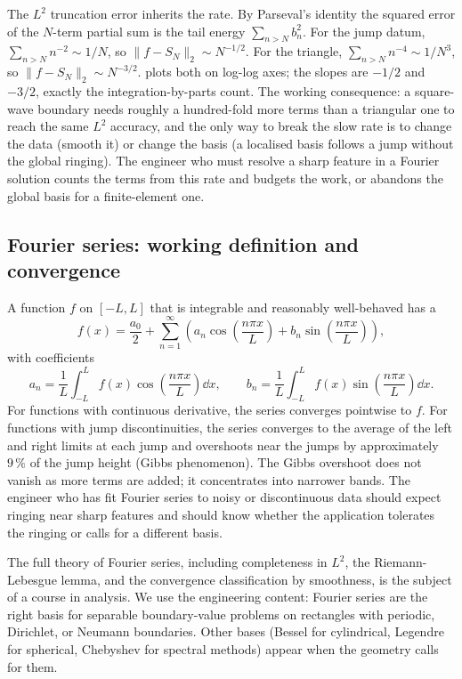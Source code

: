The $L^{2}$ truncation error inherits the rate. By Parseval's
identity the squared error of the $N$-term partial sum is the tail
energy $\sum_{n > N} b_{n}^{2}$. For the jump datum, $\sum_{n > N}
n^{-2} \sim 1/N$, so $\|f - S_{N}\|_{2} \sim N^{-1/2}$. For the
triangle, $\sum_{n > N} n^{-4} \sim 1/N^{3}$, so $\|f - S_{N}\|_{2}
\sim N^{-3/2}$.  plots both
on log-log axes; the slopes are $-1/2$ and $-3/2$, exactly the
integration-by-parts count. The working consequence: a square-wave
boundary needs roughly a hundred-fold more terms than a triangular
one to reach the same $L^{2}$ accuracy, and the only way to break
the slow rate is to change the data (smooth it) or change the basis
(a localised basis follows a jump without the global ringing). The
engineer who must resolve a sharp feature in a Fourier solution
counts the terms from this rate and budgets the work, or abandons
the global basis for a finite-element one.



\subsection{Fourier series: working definition and convergence}

A function $f$ on $[-L, L]$ that is integrable and reasonably
well-behaved has a 
\[
f(x) = \frac{a_{0}}{2} + \sum_{n = 1}^{\infty} \left(a_{n} \cos\!\left(\frac{n \pi x}{L}\right) + b_{n} \sin\!\left(\frac{n \pi x}{L}\right)\right),
\]
with coefficients
\[
a_{n} = \frac{1}{L}\int_{-L}^{L} f(x) \cos\!\left(\frac{n \pi x}{L}\right) \dd x, \qquad b_{n} = \frac{1}{L}\int_{-L}^{L} f(x) \sin\!\left(\frac{n \pi x}{L}\right) \dd x.
\]
For functions with continuous derivative, the series converges
pointwise to $f$. For functions with jump discontinuities, the
series converges to the average of the left and right limits at
each jump and overshoots near the jumps by approximately $9\,\%$
of the jump height (Gibbs phenomenon). The Gibbs overshoot does
not vanish as more terms are added; it concentrates into narrower
bands. The engineer who has fit Fourier series to noisy or
discontinuous data should expect ringing near sharp features and
should know whether the application tolerates the ringing or
calls for a different basis.

The full theory of Fourier series, including completeness in
$L^{2}$, the Riemann-Lebesgue lemma, and the convergence
classification by smoothness, is the subject of a course in
analysis. We use the engineering content: Fourier series are the
right basis for separable boundary-value problems on rectangles
with periodic, Dirichlet, or Neumann boundaries. Other bases
(Bessel for cylindrical, Legendre for spherical, Chebyshev for
spectral methods) appear when the geometry calls for them.

